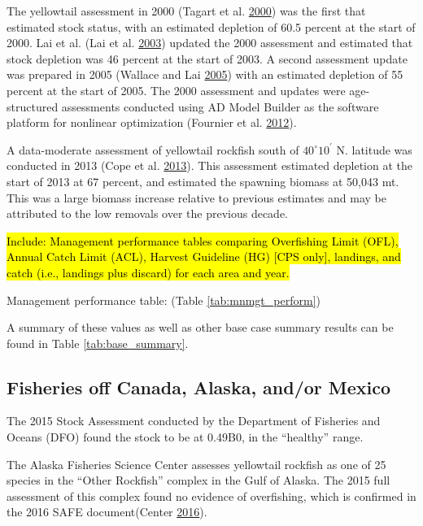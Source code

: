 \documentclass[12pt,]{article}
\begin{document}
The yellowtail assessment in 2000 (Tagart et al.
\protect\hyperlink{ref-Tagart2000}{2000}) was the first that estimated
stock status, with an estimated depletion of 60.5 percent at the start
of 2000. Lai et al. (Lai et al. \protect\hyperlink{ref-Lai2003}{2003})
updated the 2000 assessment and estimated that stock depletion was 46
percent at the start of 2003. A second assessment update was prepared in
2005 (Wallace and Lai \protect\hyperlink{ref-Wallace2005}{2005}) with an
estimated depletion of 55 percent at the start of 2005. The 2000
assessment and updates were age-structured assessments conducted using
AD Model Builder as the software platform for nonlinear optimization
(Fournier et al. \protect\hyperlink{ref-Fournier2012}{2012}).

A data-moderate assessment of yellowtail rockfish south of
\(40^\circ 10^\prime\) N. latitude was conducted in 2013 (Cope et al.
\protect\hyperlink{ref-Cope2013}{2013}). This assessment estimated
depletion at the start of 2013 at 67 percent, and estimated the spawning
biomass at 50,043 mt. This was a large biomass increase relative to
previous estimates and may be attributed to the low removals over the
previous decade.

\hl{Include: Management performance tables comparing 
Overfishing Limit (OFL), Annual Catch Limit (ACL), Harvest Guideline (HG) 
[CPS only], landings, and catch (i.e., landings plus discard) for each area and year.}

Management performance table: (Table \ref{tab:mnmgt_perform})

A summary of these values as well as other base case summary results can
be found in Table \ref{tab:base_summary}.

\subsection{Fisheries off Canada, Alaska, and/or
Mexico}\label{fisheries-off-canada-alaska-andor-mexico}

The 2015 Stock Assessment conducted by the Department of Fisheries and
Oceans (DFO) found the stock to be at 0.49B0, in the ``healthy'' range.

The Alaska Fisheries Science Center assesses yellowtail rockfish as one
of 25 species in the ``Other Rockfish'' complex in the Gulf of Alaska.
The 2015 full assessment of this complex found no evidence of
overfishing, which is confirmed in the 2016 SAFE document(Center
\protect\hyperlink{ref-AFSC2016}{2016}).
\end{document}
